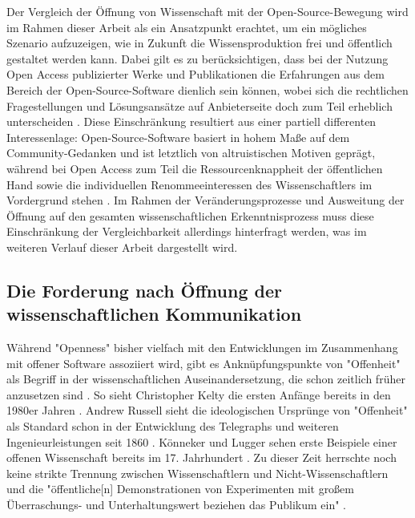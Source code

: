 Der Vergleich der Öffnung von Wissenschaft mit der Open-Source-Bewegung wird im Rahmen dieser Arbeit als ein Ansatzpunkt erachtet, um ein mögliches Szenario aufzuzeigen, wie in Zukunft die Wissensproduktion frei und öffentlich gestaltet werden kann. Dabei gilt es zu berücksichtigen, dass bei der Nutzung Open Access publizierter Werke und Publikationen die Erfahrungen aus dem Bereich der Open-Source-Software dienlich sein können, wobei sich die rechtlichen Fragestellungen und Lösungsansätze auf Anbieterseite doch zum Teil erheblich unterscheiden \cite{dorschel_2006_open}. Diese Einschränkung resultiert aus einer partiell differenten Interessenlage: Open-Source-Software basiert in hohem Maße auf dem Community-Gedanken und ist letztlich von altruistischen Motiven geprägt, während bei Open Access zum Teil die Ressourcenknappheit der öffentlichen Hand sowie die individuellen Renommeeinteressen des Wissenschaftlers im Vordergrund stehen \cite{dorschel_2006_open}. Im Rahmen der Veränderungsprozesse und Ausweitung der Öffnung auf den gesamten wissenschaftlichen Erkenntnisprozess muss diese Einschränkung der Vergleichbarkeit allerdings hinterfragt werden, was im weiteren Verlauf dieser Arbeit dargestellt wird.

\subsection{Die Forderung nach Öffnung der wissenschaftlichen Kommunikation}

Während "Openness" bisher vielfach mit den Entwicklungen im Zusammenhang mit offener Software assoziiert wird, gibt es Anknüpfungspunkte von "Offenheit" als Begriff in der wissenschaftlichen Auseinandersetzung, die schon zeitlich früher anzusetzen sind \cite{Tkacz_2014}. So sieht Christopher Kelty die ersten Anfänge bereits in den 1980er Jahren \cite{kelty_2008_two_bits}. Andrew Russell sieht die ideologischen Ursprünge von "Offenheit" als Standard schon in der Entwicklung des Telegraphs und weiteren Ingenieurleistungen seit 1860 \cite{Russell_2014}. Könneker und Lugger sehen erste Beispiele einer offenen Wissenschaft bereits im 17. Jahrhundert \cite{Konneker_2013}. Zu dieser Zeit herrschte noch keine strikte Trennung zwischen Wissenschaftlern und Nicht-Wissenschaftlern und die "öffentliche[n] Demonstrationen von Experimenten mit großem Überraschungs- und Unterhaltungswert beziehen das Publikum ein" \cite{weingart_2005_wissenschaft}.

